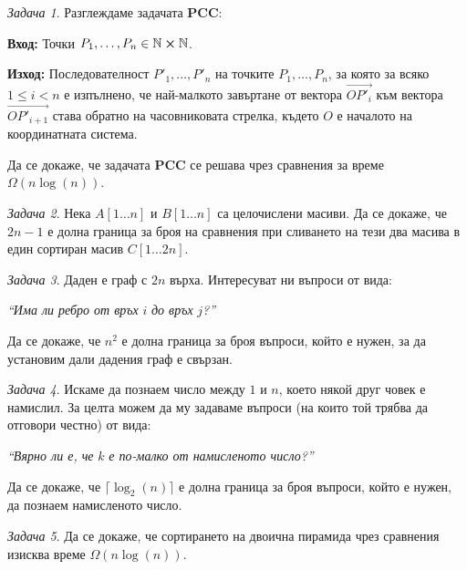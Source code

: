 \documentclass{article}
\newcommand{\N}{\mathbb{N}}
\theoremstyle{definition}
\theoremstyle{plain}
\theoremstyle{remark}
\newtheorem{problem}{Задача}
\theoremstyle{definition}
\begin{document}
\begin{problem}
Разглеждаме задачата \textbf{PCC}:

\vspace*{2mm}
\textbf{Вход:} Точки $P_1, \dots, P_n \in \N \cross \N$.

\textbf{Изход:} Последователност $P'_1, \dots, P'_n$ на точките $P_1, \dots, P_n$, за която за всяко $1 \leq i < n$ е изпълнено, че най-малкото завъртане от вектора $\overrightarrow{OP'_i}$ към вектора $\overrightarrow{OP'_{i + 1}}$ става обратно на часовниковата стрелка, където $O$ е началото на координатната система.
\vspace*{2mm}

Да се докаже, че задачата \textbf{PCC} се решава чрез сравнения за време $\Omega(n \log(n))$.
\end{problem}

\begin{problem}
Нека $A[1 \dots n]$ и $B[1 \dots n]$ са целочислени масиви.
Да се докаже, че $2n - 1$ е долна граница за броя на сравнения при сливането на тези два масива в един сортиран масив $C[1 \dots 2n]$.
\end{problem}

\begin{problem}
Даден е граф с $2n$ върха.
Интересуват ни въпроси от вида:
\begin{center}
    \textit{``Има ли ребро от връх} $i$ \textit{до връх} $j$\textit{?''}
\end{center}
Да се докаже, че $n^2$ е долна граница за броя въпроси, който е нужен, за да установим дали дадения граф е свързан.
\end{problem}

\begin{problem}
Искаме да познаем число между $1$ и $n$, което някой друг човек е намислил.
За целта можем да му задаваме въпроси (на които той трябва да отговори честно) от вида:
\begin{center}
    \textit{``Вярно ли е, че} $k$ \textit{е по-малко от намисленото число?''}
\end{center}
Да се докаже, че $\lceil \log_2(n) \rceil$ е долна граница за броя въпроси, който е нужен, да познаем намисленото число.
\end{problem}

\begin{problem}
Да се докаже, че сортирането на двоична пирамида чрез сравнения изисква време $\Omega(n \log(n))$.
\end{problem}
\end{document}
